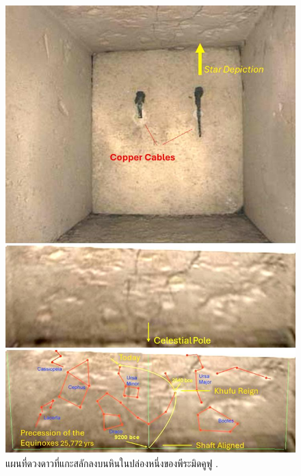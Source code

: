 \documentclass[10pt,twocolumn,letterpaper]{article}
\begin{document}
\begin{figure}[]
\begin{center}
   \includegraphics[width=1\linewidth]{star-stone.jpg}
\end{center}
   \caption{แผนที่ดวงดาวที่แกะสลักลงบนหินในปล่องหนึ่งของพีระมิดคูฟู \cite{28}.}
\label{fig:20}
\label{fig:onecol}
\end{figure}

\clearpage
\twocolumn
\end{document}
